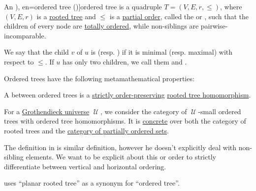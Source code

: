\begin{definition}\label{def:ordered_tree}\mimprovised
  An \term[ru=упорядоченное дерево (\cite[\S 9.3.5]{Новиков2013ДискретнаяМатематика}), en=ordered tree (\cite[698]{Rosen2018DiscreteHandbook})]{ordered tree} is a quadruple \( T = (V, E, r, \leq) \), where \( (V, E, r) \) is a \hyperref[def:rooted_tree]{rooted tree} and \( {\leq} \) is a \hyperref[def:partially_ordered_set]{partial order}, called the  or , such that the children of every node are \hyperref[def:totally_order_chain]{totally ordered}, while non-siblings are pairwise-incomparable.

  \begin{thmenum}[series=def:ordered_tree]
     We say that the child \( v \) of \( u \) is  (resp. ) if it is minimal (resp. maximal) with respect to \( {\leq} \). If \( u \) has only two children, we call them  and .
  \end{thmenum}

  Ordered trees have the following metamathematical properties:
  \begin{thmenum}
     A  between ordered trees is a \hyperref[def:order_function/preserving]{strictly order-preserving} \hyperref[def:rooted_tree/homomorphism]{rooted tree homomorphism}.

     For a \hyperref[def:grothendieck_universe]{Grothendieck universe} \( \mscrU \), we consider the category of \( \mscrU \)-small ordered trees with ordered tree homomorphisms. It is \hyperref[def:concrete_category]{concrete} over both the category of rooted trees and the \hyperref[def:partially_ordered_set]{category of partially ordered sets}.
  \end{thmenum}
\end{definition}
\begin{comments}
  \item The definition in \cite[698]{Rosen2018DiscreteHandbook} is similar definition, however he doesn't explicitly deal with non-sibling elements. We want to be explicit about this or order to strictly differentiate between vertical and horizontal ordering.

  \item {} uses \enquote{planar rooted tree} as a synonym for \enquote{ordered tree}.
\end{comments}

